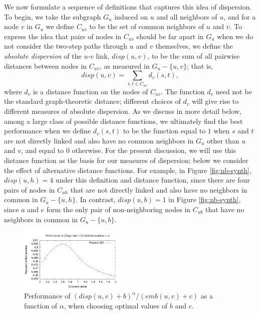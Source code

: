 \documentclass{sigchi}
\begin{document}
We now formulate a sequence of definitions that captures this idea
of dispersion.
To begin, we take the subgraph $G_u$ induced on $u$ and all
neighbors of $u$, and for a
node $v$ in $G_u$ we define $C_{uv}$ to be the set of common neighbors
of $u$ and $v$.
To express the idea that pairs of nodes in $C_{uv}$ should be far
apart in $G_u$ when we do not consider the two-step paths through
$u$ and $v$ themselves, we define the {\em absolute dispersion} 
of the $u$-$v$ link, $disp(u,v)$,
to be the sum of all pairwise distances between nodes in $C_{uv}$,
as measured in $G_u - \{u, v\}$;
that is,
$$disp(u,v) = \sum_{s, t \in C_{uv}} d_v(s,t),$$ where
$d_v$ is a distance function on the nodes of $C_{uv}$.
The function $d_v$ need not be the standard graph-theoretic distance;
different choices of $d_v$ will give rise to different
measures of absolute dispersion.
As we discuss in more detail below, 
among a large class of possible distance functions, we ultimately find the
best performance when we define $d_v(s,t)$ to be the function equal to $1$
when $s$ and $t$ are not directly linked and also
have no common neighbors in $G_u$ other than $u$ and $v$,
and equal to $0$ otherwise.
For the present discussion, we will use this distance
function as the basis for our measures of dispersion;
below we consider the effect of alternative distance functions.
For example, in Figure \ref{fig:nb-synth}, 
$disp(u,h) = 4$ under this definition and distance function, since 
there are four pairs of nodes in $C_{uh}$ that are not directly
linked and also have no neighbors in common in $G_u - \{u, h\}$.
In contrast, $disp(u,b) = 1$ in Figure \ref{fig:nb-synth}, since $a$ and $e$
form the only pair of non-neighboring nodes in $C_{ub}$ that have no neighbors 
in common in $G_u - \{u, b\}$.

\begin{figure}
\begin{center}
 \includegraphics[width=0.45\textwidth]{perf_by_exp02.pdf}
\end{center}
\caption{
Performance of $(disp(u,v) + b)^\alpha / (emb(u,v) + c)$ as a function of $\alpha$, when choosing optimal values of $b$ and $c$.
  }
\label{fig:perf_by_exp}
\end{figure}
\end{document}
